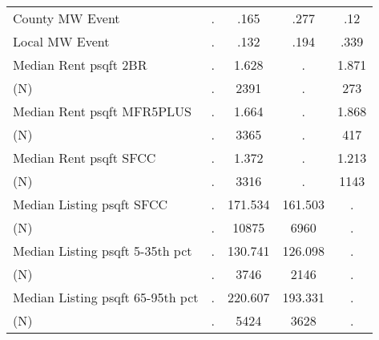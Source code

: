 \begin{tabular}{l*{4}{c}}
County MW Event&           .&        .165&        .277&         .12\\
Local MW Event&           .&        .132&        .194&        .339\\
Median Rent psqft 2BR&           .&       1.628&           .&       1.871\\
(N)         &           .&        2391&           .&         273\\
Median Rent psqft MFR5PLUS&           .&       1.664&           .&       1.868\\
(N)         &           .&        3365&           .&         417\\
Median Rent psqft SFCC&           .&       1.372&           .&       1.213\\
(N)         &           .&        3316&           .&        1143\\
Median Listing psqft SFCC&           .&     171.534&     161.503&           .\\
(N)         &           .&       10875&        6960&           .\\
Median Listing psqft 5-35th pct&           .&     130.741&     126.098&           .\\
(N)         &           .&        3746&        2146&           .\\
Median Listing psqft 65-95th pct&           .&     220.607&     193.331&           .\\
(N)         &           .&        5424&        3628&           .\\
\hline\hline
\end{tabular}
